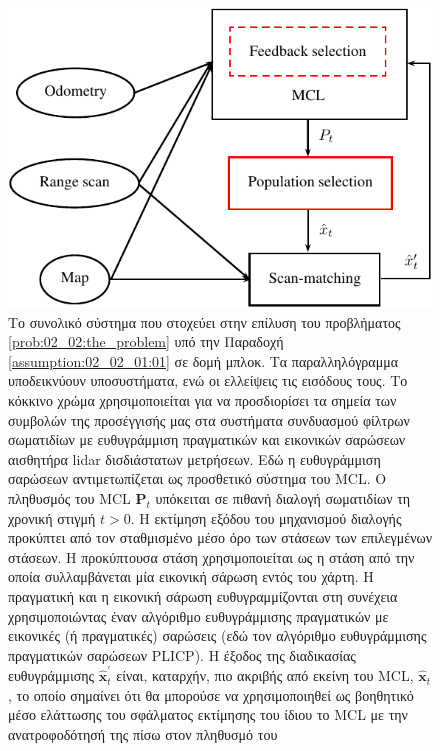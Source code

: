 \begin{figure}[h]\centering
  \includegraphics{./figures/parts/02/chapters/02/sections/03/overall_system}
  \caption{\small Το συνολικό σύστημα που στοχεύει στην επίλυση του προβλήματος
           \ref{prob:02_02:the_problem} υπό την Παραδοχή
           \ref{assumption:02_02_01:01} σε δομή μπλοκ. Τα παραλληλόγραμμα
           υποδεικνύουν υποσυστήματα, ενώ οι ελλείψεις τις εισόδους τους. Το
           κόκκινο χρώμα χρησιμοποιείται για να προσδιορίσει τα σημεία των
           συμβολών της προσέγγισής μας στα συστήματα συνδυασμού φίλτρων
           σωματιδίων με ευθυγράμμιση πραγματικών και εικονικών σαρώσεων
           αισθητήρα lidar δισδιάστατων μετρήσεων. Εδώ η ευθυγράμμιση σαρώσεων
           αντιμετωπίζεται ως προσθετικό σύστημα του MCL. Ο πληθυσμός του MCL
           $\bm{P}_t$ υπόκειται σε πιθανή διαλογή σωματιδίων τη χρονική στιγμή
           $t>0$. Η εκτίμηση εξόδου του μηχανισμού διαλογής προκύπτει από τον
           σταθμισμένο μέσο όρο των στάσεων των επιλεγμένων στάσεων. Η
           προκύπτουσα στάση χρησιμοποιείται ως η στάση από την οποία
           συλλαμβάνεται μία εικονική σάρωση εντός του χάρτη. Η πραγματική και
           η εικονική σάρωση ευθυγραμμίζονται στη συνέχεια χρησιμοποιώντας έναν
           αλγόριθμο ευθυγράμμισης πραγματικών με εικονικές (ή πραγματικές)
           σαρώσεις (εδώ τον αλγόριθμο ευθυγράμμισης πραγματικών σαρώσεων
           PLICP). Η έξοδος της διαδικασίας ευθυγράμμισης
           $\hat{\bm{x}}^{\prime}_t$ είναι, καταρχήν, πιο ακριβής από εκείνη
           του MCL, $\hat{\bm{x}}_t$, το οποίο σημαίνει ότι θα μπορούσε να
           χρησιμοποιηθεί ως βοηθητικό μέσο ελάττωσης του σφάλματος εκτίμησης
           του ίδιου το MCL με την ανατροφοδότησή της πίσω στον πληθυσμό του}
  \label{fig:overall_system}
\end{figure}
